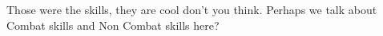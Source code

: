 Those were the skills, they are cool don't you think. Perhaps we talk about Combat skills and Non Combat skills here?